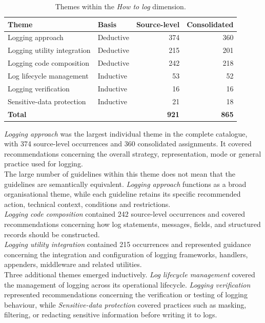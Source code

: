 \begin{table}[H]
    \centering

    \begin{tabularx}{\textwidth}{X l rr}
        \toprule
        \textbf{Theme} &
        \textbf{Basis} &
        \textbf{Source-level} &
        \textbf{Consolidated} \\
        \midrule
        Logging approach & Deductive & 374 & 360 \\
        Logging utility integration & Deductive & 215 & 201 \\
        Logging code composition & Deductive & 242 & 218 \\
        Log lifecycle management & Inductive & 53 & 52 \\
        Logging verification & Inductive & 16 & 16 \\
        Sensitive-data protection & Inductive & 21 & 18 \\
        \midrule
        \textbf{Total} & & \textbf{921} & \textbf{865} \\
        \bottomrule
    \end{tabularx}

    \caption{Themes within the \textit{How to log} dimension.}
    \label{tab:themes-how-to-log}
\end{table}

\textit{Logging approach} was the largest individual theme in the complete
catalogue, with 374 source-level occurrences and 360 consolidated assignments. It
covered recommendations concerning the overall strategy, representation, mode or
general practice used for logging.
\\
The large number of guidelines within this theme does not mean that the guidelines
are semantically equivalent. \textit{Logging approach} functions as a broad
organisational theme, while each guideline retains its specific
recommended action, technical context, conditions and restrictions.
\\
\textit{Logging code composition} contained 242 source-level occurrences and
covered recommendations concerning how log statements, messages, fields, and
structured records should be constructed.
\\
\textit{Logging utility integration} contained 215 occurrences and represented
guidance concerning the integration and configuration of logging frameworks,
handlers, appenders, middleware and related utilities.
\\
Three additional themes emerged inductively. \textit{Log lifecycle management}
covered the management of logging across its operational lifecycle.
\textit{Logging verification} represented recommendations concerning the
verification or testing of logging behaviour, while
\textit{Sensitive-data protection} covered practices such as masking, filtering,
or redacting sensitive information before writing it to logs.


